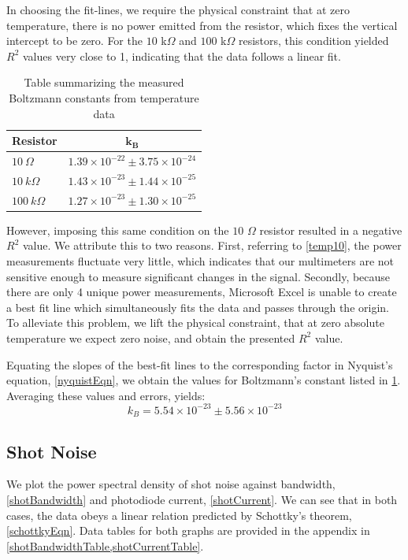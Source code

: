 \documentclass[12pt]{article}
\begin{document}
	In choosing the fit-lines, we require the physical constraint that at zero temperature, there is no power emitted from the resistor, which fixes the vertical intercept to be zero. For the $10$ k$\Omega$ and $100$ k$\Omega$ resistors, this condition yielded $R^2$ values very close to 1, indicating that the data follows a linear fit.
	
	\begin{table}
		\begin{tabular}{l c}
			\toprule
			\textbf{Resistor} & $\mathbf{k_B}$ \\ \toprule
			$10 \ \Omega$ & $1.39\times 10^{-22} \pm 3.75\times 10^{-24}$ \\
			$10 \ k\Omega$ & $1.43\times 10^{-23} \pm 1.44\times10^{-25}$\\
			$100 \ k\Omega$ & $1.27 \times 10^{-23} \pm 1.30\times10^{-25} $ \\ 
			\bottomrule			
		\end{tabular}
		\caption{Table summarizing the measured Boltzmann constants from temperature data}
		\label{BoltzmannTable}
	\end{table}
	
	However, imposing this same condition on the $10$ $\Omega$ resistor resulted in a negative $R^2$ value. We attribute this to two reasons. First, referring to \cref{temp10}, the power measurements fluctuate very little, which indicates that our multimeters are not sensitive enough to measure significant changes in the signal. Secondly, because there are only 4 unique power measurements, Microsoft Excel is unable to create a best fit line which simultaneously fits the data and passes through the origin. To alleviate this problem, we lift the physical constraint, that at zero absolute temperature we expect zero noise, and obtain the presented $R^2$ value. 
	
	Equating the slopes of the best-fit lines to the corresponding factor in Nyquist's equation, \cref{nyquistEqn}, we obtain the values for Boltzmann's constant listed in \cref{BoltzmannTable}. Averaging these values and errors, yields:
	\begin{equation}
		k_B = 5.54 \times 10^{-23} \pm 5.56 \times 10 ^{-23}		
	\end{equation}

	
	\subsection{Shot Noise}
	We plot the power spectral density of shot noise against bandwidth, \cref{shotBandwidth} and photodiode current, \cref{shotCurrent}. We can see that in both cases, the data obeys a linear relation predicted by Schottky's theorem, \cref{schottkyEqn}. Data tables for both graphs are provided in the appendix in \cref{shotBandwidthTable,shotCurrentTable}.
\end{document}
